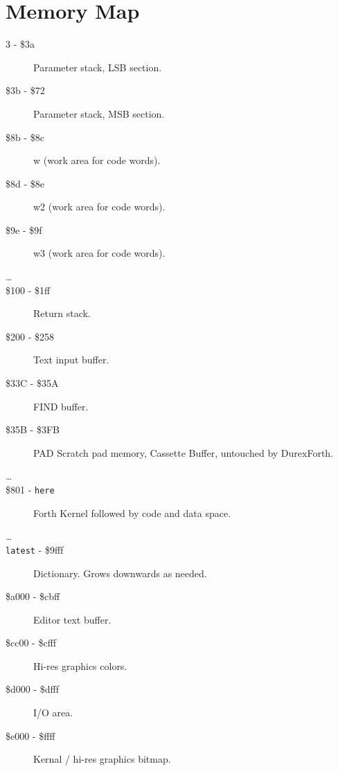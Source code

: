 \chapter{Memory Map}

\begin{description}
\item[3 - \$3a] Parameter stack, LSB section.
\item[\$3b - \$72] Parameter stack, MSB section.
\item[\$8b - \$8c] w (work area for code words).
\item[\$8d - \$8e] w2 (work area for code words).
\item[\$9e - \$9f] w3 (work area for code words).
\item[\ldots]
\item[\$100 - \$1ff] Return stack.

\item[\$200 - \$258] Text input buffer.
\item[\$33C - \$35A] FIND buffer.
\item[\$35B - \$3FB] PAD Scratch pad memory, Cassette Buffer, untouched by DurexForth.
\item[\ldots]
\item[\$801 - \texttt{here}] Forth Kernel followed by code and data space.
\item[\ldots]
\item[\texttt{latest} - \$9fff] Dictionary. Grows downwards as needed.
\item[\$a000 - \$cbff] Editor text buffer.
\item[\$cc00 - \$cfff] Hi-res graphics colors.
\item[\$d000 - \$dfff] I/O area.
\item[\$e000 - \$ffff] Kernal / hi-res graphics bitmap.

\end{description}

